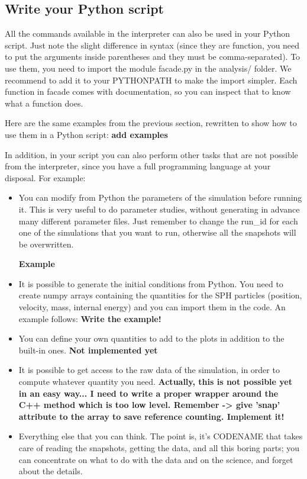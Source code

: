 \documentclass[a4paper]{article}
\begin{document}
\subsection{Write your Python script}

All the commands available in the interpreter can also be used in your Python script. Just note the slight difference in syntax (since they are function, you need to put the arguments inside parentheses and they must be comma-separated). To use them, you need to import the module facade.py in the analysis/ folder. We recommend to add it to your PYTHONPATH to make the import simpler. Each function in facade comes with documentation, so you can inspect that to know what a function does.

Here are the same examples from the previous section, rewritten to show how to use them in a Python script:
\textbf{add examples}

In addition, in your script you can also perform other tasks that are not possible from the interpreter, since you have a full programming language at your disposal. For example:
\begin{itemize}

\item You can modify from Python the parameters of the simulation before running it. This is very useful to do parameter studies, without generating in advance many different parameter files. Just remember to change the run\_id for each one of the simulations that you want to run, otherwise all the snapshots will be overwritten.

\textbf{Example}

\item It is possible to generate the initial conditions from Python. You need to create numpy arrays containing the quantities for the SPH particles (position, velocity, mass, internal energy) and you can import them in the code. An example follows:
\textbf{Write the example!}

\item You can define your own quantities to add to the plots in addition to the built-in ones. \textbf{Not implemented yet}

\item It is possible to get access to the raw data of the simulation, in order to compute whatever quantity you need. \textbf{Actually, this is not possible yet in an easy way... I need to write a proper wrapper around the C++ method which is too low level. Remember -> give 'snap' attribute to the array to save reference counting. Implement it!}

\item Everything else that you can think. The point is, it's CODENAME that takes care of reading the snapshots, getting the data, and all this boring parts; you can concentrate on what to do with the data and on the science, and forget about the details.

\end{itemize}
\end{document}

